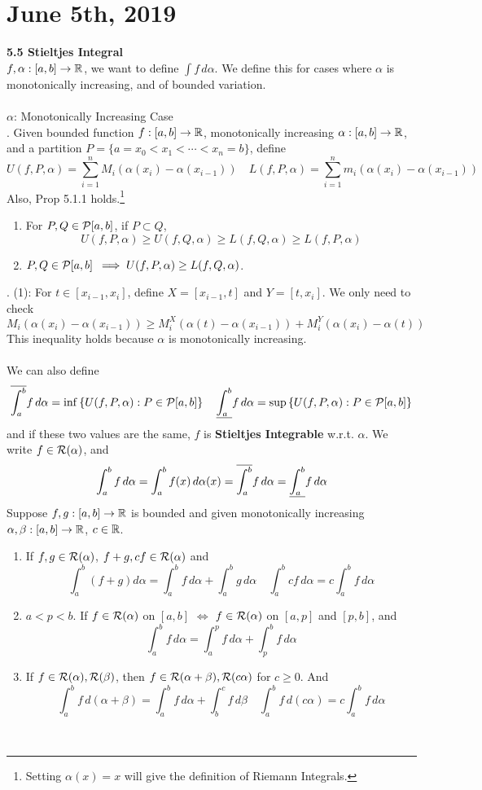 \section*{June 5th, 2019}
\textbf{5.5 Stieltjes Integral}\\
$f, \alpha:[a, b]\rightarrow\mathbb{R}$, we want to define $ \int f \,d\alpha$. We define this for cases where $\alpha$ is monotonically increasing, and of bounded variation.\\
\\
$\alpha$: Monotonically Increasing Case\\
. Given bounded function $f:[a, b]\rightarrow\mathbb{R}$, monotonically increasing $\alpha:[a, b]\rightarrow\mathbb{R}$, and a partition $P = \{a=x_0<x_1<\cdots<x_n=b  \}$, define
$$U(f, P, \alpha) = \sum_{i=1}^n M_i (\alpha(x_i) - \alpha(x_{i-1})) \quad L(f, P, \alpha) = \sum_{i=1}^n m_i (\alpha(x_i) - \alpha(x_{i-1}))$$
Also, Prop 5.1.1 holds.\footnote{Setting $\alpha(x) = x$ will give the definition of Riemann Integrals.}
\begin{enumerate}
	\item For $P, Q\in \mathcal{P}[a, b]$, if $P\subset Q$,
	$$ U(f, P, \alpha) \geq U(f, Q, \alpha) \geq L(f, Q, \alpha) \geq L(f, P, \alpha) $$
	\item $P, Q\in \mathcal{P}[a, b]$ $ \implies U(f, P, \alpha) \geq L(f, Q, \alpha)$.
\end{enumerate}
\pf. (1): For $t\in [x_{i-1}, x_i]$, define $X = [x_{i-1}, t]$ and $Y = [t, x_i]$. We only need to check $$M_i (\alpha(x_i)-\alpha(x_{i-1})) \geq M_{i}^X(\alpha(t) - \alpha(x_{i-1})) + M_{i}^Y(\alpha(x_{i}) - \alpha(t))$$
This inequality holds because $\alpha$ is monotonically increasing.\\
\\
We can also define
$$\overline{\int_a^b}f\,d\alpha = \inf\left\{ U(f, P, \alpha): P\in\mathcal{P}[a, b] \right\} \quad \underline{\int_a^b}f\,d\alpha = \sup\left\{ U(f, P, \alpha): P\in\mathcal{P}[a, b] \right\} $$
and if these two values are the same, $f$ is \textbf{Stieltjes Integrable} w.r.t. $\alpha$. We write $f\in \mathcal{R}(\alpha)$, and $$\int_a^b f\,d\alpha = \int_a^b f(x)\,d\alpha(x) = \overline{\int_a^b}f\,d\alpha = \underline{\int_a^b}f\,d\alpha $$
 Suppose $f, g:[a, b]\rightarrow\mathbb{R}$ is bounded and given monotonically increasing $\alpha, \beta:[a, b]\rightarrow\mathbb{R}$, $c\in \mathbb{R}$.
\begin{enumerate}
	\item If $f, g \in \mathcal{R}(\alpha)$, $f+g, cf \in \mathcal{R}(\alpha)$ and $$\int_a^b (f+g) d\alpha = \int_a^b f\,d\alpha + \int_a^b g\,d\alpha \quad \int_a^b cf\,d\alpha = c\int_a^b f\,d\alpha$$	\item $a<p<b$. If $f\in \mathcal{R}(\alpha)$ on $[a, b]$ $\iff$ $f\in \mathcal{R}(\alpha)$ on $[a, p]$ and $[p, b]$, and
	$$\int_a^b f\,d\alpha = \int_a^p f\,d\alpha + \int_p^b f\,d\alpha$$
	\item If $f\in \mathcal{R}(\alpha), \mathcal{R}(\beta)$, then $f\in \mathcal{R}(\alpha + \beta), \mathcal{R}(c\alpha)$ for $c\geq0$. And
	$$\int_a^b f\, d(\alpha+\beta) = \int_a^b f\,d\alpha + \int_b^c f\,d\beta\quad \int_a^b f\, d(c\alpha) = c\int_a^b f\,d\alpha$$
\end{enumerate}~\\
